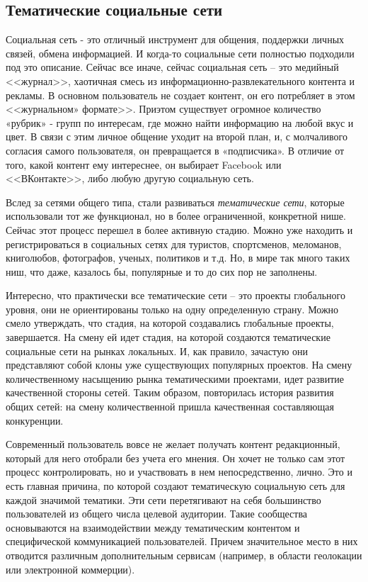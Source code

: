 \subsection{Тематические социальные сети}
\label{sec:analysis:analogues}

Социальная сеть - это отличный инструмент для общения, поддержки личных связей, обмена информацией. И когда-то социальные сети полностью подходили под это описание.
Сейчас все иначе, сейчас социальная сеть -- это медийный <<журнал>>, хаотичная смесь из информационно-развлекательного контента и рекламы. В основном пользователь не создает контент, он его потребляет в этом <<журнальном» формате>>. Приэтом существует огромное количество «рубрик» - групп по интересам, где можно найти информацию на любой вкус и цвет. В связи с этим личное общение уходит на второй план, и, с молчаливого согласия самого пользователя, он превращается в «подписчика». В отличие от того, какой контент ему интереснее, он выбирает Facebook или <<ВКонтакте>>, либо любую другую социальную сеть.

Вслед за сетями общего типа, стали развиваться \emph{тематические сети}, которые использовали тот же функционал, но в более ограниченной, конкретной нише. Сейчас этот процесс перешел в более активную стадию. Можно уже находить и регистрироваться в социальных сетях для туристов, спортсменов, меломанов, книголюбов, фотографов, ученых, политиков и т.д. Но, в мире так много таких ниш, что даже, казалось бы, популярные и то до сих пор не заполнены. 

Интересно, что практически все тематические сети -- это проекты глобального уровня, они не ориентированы только на одну определенную страну. Можно смело утверждать, что стадия, на которой создавались глобальные проекты, завершается. На смену ей идет стадия, на которой создаются тематические социальные сети на рынках локальных. И, как правило, зачастую они представляют собой клоны уже существующих популярных проектов. На смену количественному насыщению рынка тематическими проектами, идет развитие качественной стороны сетей. Таким образом, повторилась история развития общих сетей: на смену количественной пришла качественная составляющая конкуренции.

Современный пользователь вовсе не желает получать контент редакционный, который для него отобрали без учета его мнения. Он хочет не только сам этот процесс контролировать, но и участвовать в нем непосредственно, лично. Это и есть главная причина, по которой создают тематическую социальную сеть для каждой значимой тематики. Эти сети перетягивают на себя большинство пользователей из общего числа целевой аудитории. Такие сообщества основываются на взаимодействии между тематическим контентом и специфической коммуникацией пользователей. Причем значительное место в них отводится различным дополнительным сервисам (например, в области геолокации или электронной коммерции).



